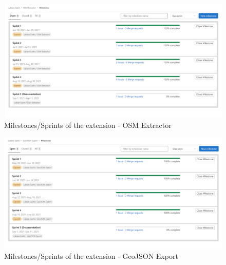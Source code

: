 \begin{figure}[H]
    \includegraphics[width=\linewidth]{./Figures/Appendices/gitlab_milestones_osm_extractor}
    \caption{Milestones/Sprints of the extension - OSM Extractor}
\end{figure}
\begin{figure}[H]
    \includegraphics[width=\linewidth]{./Figures/Appendices/gitlab_milestones_geojson_export}
    \caption{Milestones/Sprints of the extension - GeoJSON Export}
\end{figure}